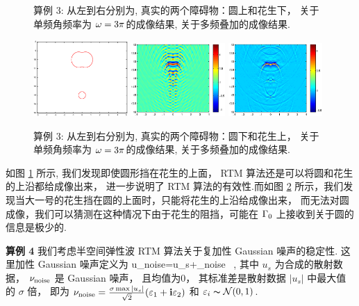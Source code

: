 {\begin{figure}[htbp]
	\caption{算例 3: 从左到右分别为,  真实的两个障碍物：圆上和花生下， 关于单频角频率为 $\omega=3\pi$的成像结果, 关于多频叠加的成像结果.}\label{figure_32}
\end{figure}


\begin{figure}[htbp]
 	\centering
 	\includegraphics[width=0.32\textwidth,height=0.16\textheight]{./Img/graphic/circle_0_4_peanut_1_profile_reverse.eps}
 	\includegraphics[width=0.32\textwidth]{./Img/graphic/circle_0_4_peanut_1_3pi_down.eps}
 	\includegraphics[width=0.32\textwidth]{./Img/graphic/circle_0_4_peanut_1_multi_down.eps}
 	
 	\caption{算例 3: 从左到右分别为,  真实的两个障碍物：圆下和花生上， 关于单频角频率为 $\omega=3\pi$的成像结果, 关于多频叠加的成像结果.}\label{figure_33}
 \end{figure}

  如图 \ref{figure_32} 所示, 我们发现即使圆形挡在花生的上面， RTM 算法还是可以将圆和花生的上沿都给成像出来， 进一步说明了 RTM 算法的有效性.而如图 \ref{figure_33} 所示，我们发现当大一号的花生挡在圆的上面时，只能将花生的上沿给成像出来， 而无法对圆成像，我们可以猜测在这种情况下由于花生的阻挡，可能在 $\Gamma_0$ 上接收到关于圆的信息是极少的.
  
\bigskip
\textbf{算例 4}
我们考虑半空间弹性波 RTM 算法关于复加性 Gaussian 噪声的稳定性. 这里加性 Gaussian 噪声定义为 
\ben
u_{\rm noise}=u_s+\nu_{\rm noise} \ ,
\een
其中 $u_s$ 为合成的散射数据， $\nu_{\rm noise}$ 是 Gaussian 噪声， 且均值为0， 其标准差是散射数据 $|u_s|$ 中最大值的 $\sigma$ 倍， 即为 $\nu_{\rm noise}=\frac{\sigma \max |u_s|}{\sqrt{2}}(\varepsilon_1+\mathbf{i}\varepsilon_2)$ 和 $\varepsilon_i\thicksim \mathcal{N}(0,1)$.

}
